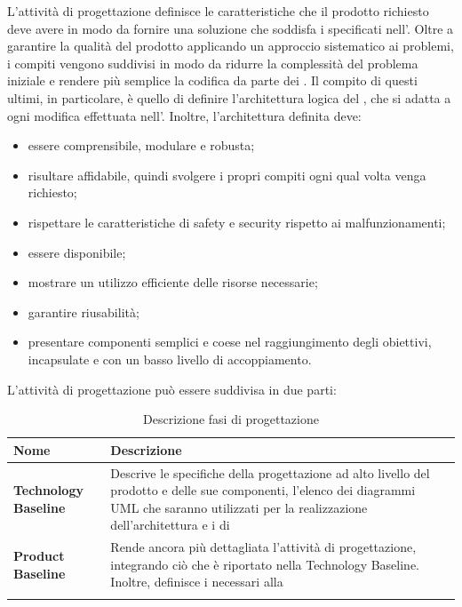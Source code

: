 L'attività di progettazione definisce le caratteristiche che il prodotto richiesto deve avere in modo da fornire una soluzione che soddisfa i  specificati nell'\AdR{}. Oltre a garantire la qualità del prodotto applicando un approccio sistematico ai problemi, i compiti vengono suddivisi in modo da ridurre la complessità del problema iniziale e rendere più semplice la codifica da parte dei \progrs{}. Il compito di questi ultimi, in particolare, è quello di definire l'architettura logica del , che si adatta a ogni modifica effettuata nell'\AdR{}. Inoltre, l'architettura definita deve:
\begin{itemize}
\item essere comprensibile, modulare e robusta;
\item risultare affidabile, quindi svolgere i propri compiti ogni qual volta venga richiesto;
\item rispettare le caratteristiche di safety e security rispetto ai malfunzionamenti;
\item essere disponibile;
\item mostrare un utilizzo efficiente delle risorse necessarie;
\item garantire riusabilità;
\item presentare componenti semplici e coese nel raggiungimento degli obiettivi, incapsulate e con un basso livello di accoppiamento.
\end{itemize}
L'attività di progettazione può essere suddivisa in due parti:

\setlength{\freewidth}{\dimexpr\textwidth-0\tabcolsep}
	\renewcommand{\arraystretch}{1.5}
	\setlength{\aboverulesep}{0pt}
	\setlength{\belowrulesep}{0pt}
	\begin{longtable}{L{.15\freewidth} L{.6\freewidth} L{.080\freewidth}}
		\textbf{Nome} & \textbf{Descrizione} \\
		\toprule
		\endhead		
		\textbf{Technology Baseline} &  Descrive le specifiche della progettazione ad alto livello del prodotto e delle sue componenti, l'elenco dei diagrammi UML che saranno utilizzati per la realizzazione dell'architettura e i  di \\
		\textbf{Product Baseline} & Rende ancora più dettagliata l'attività di progettazione, integrando ciò che è riportato nella Technology Baseline. Inoltre, definisce i  necessari alla  \\
		\bottomrule
		\hiderowcolors
		\caption{Descrizione fasi di progettazione}
	\end{longtable}

